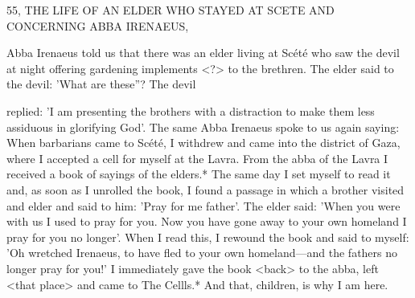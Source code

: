 55, THE LIFE OF AN ELDER WHO STAYED AT SCETE
AND CONCERNING ABBA IRENAEUS,

Abba Irenaeus told us that there was an elder living at Scété who
saw the devil at night offering gardening implements <?> to the
brethren. The elder said to the devil: 'What are these”? The devil

replied: 'I am presenting the brothers with a distraction to make
them less assiduous in glorifying God'. The same Abba Irenaeus
spoke to us again saying: When barbarians came to Scété, I
withdrew and came into the district of Gaza, where I accepted a cell
for myself at the Lavra. From the abba of the Lavra I received a
book of sayings of the elders.* The same day I set myself to read it
and, as soon as I unrolled the book, I found a passage in which a
brother visited and elder and said to him: 'Pray for me father'. The
elder said: 'When you were with us I used to pray for you. Now you
have gone away to your own homeland I pray for you no longer'.
When I read this, I rewound the book and said to myself: 'Oh
wretched Irenaeus, to have fled to your own homeland—and the
fathers no longer pray for you!' I immediately gave the book
<back> to the abba, left <that place> and came to The Cellls.* And
that, children, is why I am here.

